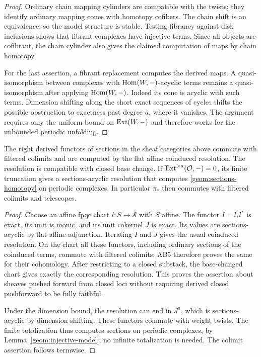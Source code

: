 \begin{proof}
Ordinary chain mapping cylinders are compatible with the twists;
they identify ordinary mapping cones with homotopy cofibers.
The chain shift is an equivalence, so the model structure is stable.
Testing fibrancy against disk inclusions shows that fibrant complexes
have injective terms.  Since all objects are cofibrant, the chain
cylinder also gives the claimed computation of maps by chain homotopy.

For the last assertion, a fibrant replacement computes the derived
maps.  A quasi-isomorphism between complexes with
$\operatorname{Hom}(W,-)$-acyclic terms remains a quasi-isomorphism after applying
$\operatorname{Hom}(W,-)$.  Indeed its cone is acyclic with such terms.  Dimension
shifting along the short exact sequences of cycles shifts the
possible obstruction to exactness past degree $a$, where it vanishes.
The argument requires only the uniform bound on $\operatorname{Ext}(W,-)$ and
therefore works for the unbounded periodic unfolding.
\end{proof}

\begin{lemma}\label{geom:sections-resolution}
The right derived functors of sections in the sheaf categories above
commute with filtered colimits and are computed by the flat affine coinduced
resolution.  The resolution is compatible with closed base change.
If $\operatorname{Ext}^{>a}(\mathcal O,-)=0$, its finite truncation gives a
sections-acyclic resolution that computes \eqref{geom:sections-homotopy}
on periodic complexes.  In particular $\pi_*$ then commutes with
filtered colimits and telescopes.
\end{lemma}

\begin{proof}
Choose an affine fpqc chart $l:S\to\mathcal S$ with $S$ affine.
The functor $I=l_*l^*$ is exact, its unit is monic, and its unit
cokernel $J$ is exact.  Its values are sections-acyclic by flat
affine adjunction.  Iterating $I$ and $J$ gives the usual coinduced
resolution.  On the chart all these functors, including ordinary
sections of the coinduced terms, commute with filtered colimits;
AB5 therefore proves the same for their cohomology.  After restricting
to a closed substack, the base-changed chart gives exactly the
corresponding resolution.  This proves the assertion about sheaves
pushed forward from closed loci without requiring derived closed
pushforward to be fully faithful.

Under the dimension bound, the resolution can end in $J^a$, which is
sections-acyclic by dimension shifting.  These functors commute with
weight twists.  The finite totalization thus computes sections on
periodic complexes, by Lemma~\ref{geom:injective-model}; no infinite
totalization is needed.  The colimit assertion follows termwise.
\end{proof}

